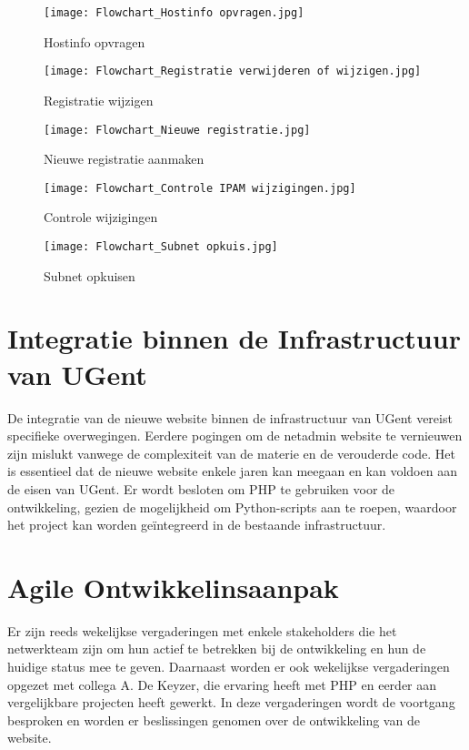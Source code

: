 \begin{figure}[H]
	\texttt{[image: Flowchart\_Hostinfo opvragen.jpg]}
	\caption{Hostinfo opvragen}
	\label{fig:flowchart_hostinfo_opvragen}
\end{figure}
\begin{figure}[H]
    \texttt{[image: Flowchart\_Registratie verwijderen of wijzigen.jpg]}
    \caption{Registratie wijzigen}
    \label{fig:flowchart_registratie_wijzigen}
\end{figure}
\begin{figure}[H]
    \texttt{[image: Flowchart\_Nieuwe registratie.jpg]}
    \caption{Nieuwe registratie aanmaken}
    \label{fig:flowchart_nieuwe_registratie}
\end{figure}
\begin{figure}[H]
    \texttt{[image: Flowchart\_Controle IPAM wijzigingen.jpg]}
    \caption{Controle wijzigingen}
    \label{fig:flowchart_controle_Wijzigingen}
\end{figure}
\begin{figure}[H]
    \texttt{[image: Flowchart\_Subnet opkuis.jpg]}
    \caption{Subnet opkuisen}
    \label{fig:flowchart_subnet_opkuisen}
\end{figure}

\section{Integratie binnen de Infrastructuur van UGent}
De integratie van de nieuwe website binnen de infrastructuur van UGent vereist specifieke overwegingen. Eerdere pogingen om de netadmin website te vernieuwen zijn mislukt vanwege de complexiteit van de materie en de verouderde code. Het is essentieel dat de nieuwe website enkele jaren kan meegaan en kan voldoen aan de eisen van UGent. Er wordt besloten om PHP te gebruiken voor de ontwikkeling, gezien de mogelijkheid om Python-scripts aan te roepen, waardoor het project kan worden geïntegreerd in de bestaande infrastructuur.

\section{Agile Ontwikkelinsaanpak}
Er zijn reeds wekelijkse vergaderingen met enkele stakeholders die het netwerkteam zijn om hun actief te betrekken bij de ontwikkeling en hun de huidige status mee te geven. Daarnaast worden er ook wekelijkse vergaderingen opgezet met collega A. De Keyzer, die ervaring heeft met PHP en eerder aan vergelijkbare projecten heeft gewerkt. In deze vergaderingen wordt de voortgang besproken en worden er  beslissingen genomen over de ontwikkeling van de website.

